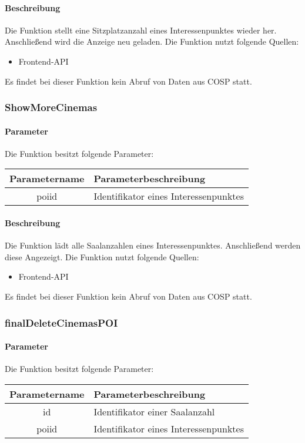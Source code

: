 \paragraph{Beschreibung} Die Funktion stellt eine Sitzplatzanzahl eines Interessenpunktes wieder her. Anschließend wird die Anzeige neu geladen. Die Funktion nutzt folgende Quellen:
\begin{itemize}
	\item Frontend-API
\end{itemize}
Es findet bei dieser Funktion kein Abruf von Daten aus {\glqq COSP\grqq} statt.
\subsubsection{ShowMoreCinemas}
\paragraph{Parameter} Die Funktion besitzt folgende Parameter:
\begin{table}[H]
	\begin{tabular}{|c|p{11cm}|}
		\hline
		\textbf{Parametername} & \textbf{Parameterbeschreibung} \\ \hline
		poiid & Identifikator eines Interessenpunktes \\ \hline
	\end{tabular}
\end{table}
\paragraph{Beschreibung} Die Funktion lädt alle Saalanzahlen eines Interessenpunktes. Anschließend werden diese Angezeigt. Die Funktion nutzt folgende Quellen:
\begin{itemize}
	\item Frontend-API
\end{itemize}
Es findet bei dieser Funktion kein Abruf von Daten aus {\glqq COSP\grqq} statt.
\subsubsection{finalDeleteCinemasPOI}
\paragraph{Parameter} Die Funktion besitzt folgende Parameter:
\begin{table}[H]
	\begin{tabular}{|c|p{11cm}|}
		\hline
		\textbf{Parametername} & \textbf{Parameterbeschreibung} \\ \hline
		id    & Identifikator einer Saalanzahl \\ \hline
		poiid & Identifikator eines Interessenpunktes \\ \hline
	\end{tabular}
\end{table}
